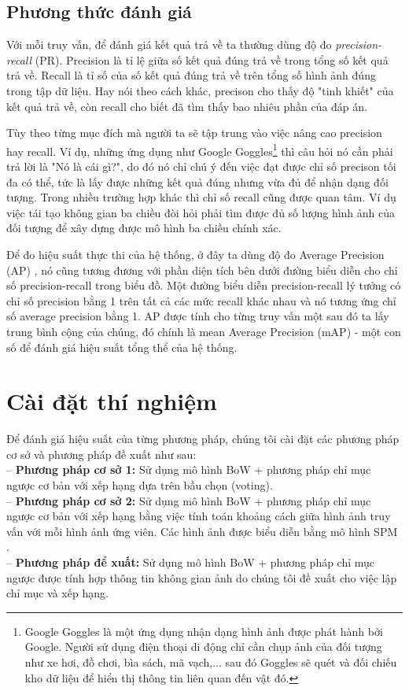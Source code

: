 \subsection{Phương thức đánh giá}
\label{evaluation}
Với mỗi truy vấn, để đánh giá kết quả trả về ta thường dùng độ đo \textit{precision-recall} (PR). Precision là tỉ lệ giữa số kết quả đúng trả về trong tổng số kết quả trả về. Recall là tỉ số của số kết quả đúng trả về trên tổng số hình ảnh đúng trong tập dữ liệu. Hay nói theo cách khác, precison cho thấy độ "tinh khiết" của kết quả trả về, còn recall cho biết đã tìm thấy bao nhiêu phần của đáp án.

Tùy theo từng mục đích mà người ta sẽ tập trung vào việc nâng cao precision hay recall. Ví dụ, những ứng dụng như Google Goggles\footnote{Google Goggles là một ứng dụng nhận dạng hình ảnh được phát hành bởi Google. Người sử dụng điện thoại di động chỉ cần chụp ảnh của đối tượng như xe hơi, đồ chơi, bìa sách, mã vạch,... sau đó Goggles sẽ quét và đối chiếu kho dữ liệu để hiển thị thông tin liên quan đến vật đó.} thì câu hỏi nó cần phải trả lời là "Nó là cái gì?", do đó nó chỉ chú ý đến việc đạt được chỉ số precison tối đa có thể, tức là lấy được những kết quả đúng nhưng vừa đủ để nhận dạng đối tượng. Trong nhiều trường hợp khác thì chỉ số recall cũng được quan tâm. Ví dụ việc tái tạo không gian ba chiều đòi hỏi phải tìm được đủ số lượng hình ảnh của đối tượng để xây dựng được mô hình ba chiều chính xác.

Để đo hiệu suất thực thi của hệ thống, ở đây ta dùng độ đo Average Precision (AP) \cite{philbin2007object}, nó cũng tương đương với phần diện tích bên dưới đường biểu diễn cho chỉ số precision-recall trong biểu đồ. Một đường biểu diễn precision-recall lý tưởng có chỉ số precision bằng 1 trên tất cả các mức recall khác nhau và nó tương ứng chỉ số average precision bằng 1. AP được tính cho từng truy vấn một sau đó ta lấy trung bình cộng của chúng, đó chính là mean Average Precision (mAP) - một con số để đánh giá hiệu suất tổng thể của hệ thống.

\section{Cài đặt thí nghiệm}
\label{experimental-setting}
Để đánh giá hiệu suất của từng phương pháp, chúng tôi cài đặt các phương pháp cơ sở và phương pháp đề xuất như sau:\\
-- \textbf{Phương pháp cơ sở 1:} Sử dụng mô hình BoW + phương pháp chỉ mục ngược cơ bản với xếp hạng dựa trên bầu chọn (voting).\\
-- \textbf{Phương pháp cơ sở 2:} Sử dụng mô hình BoW + phương pháp chỉ mục ngược cơ bản với xếp hạng bằng việc tính toán khoảng cách giữa hình ảnh truy vấn với mỗi hình ảnh ứng viên. Các hình ảnh được biểu diễn bằng mô hình SPM \cite{lazebnik2006beyond}.\\
-- \textbf{Phương pháp để xuất:} Sử dụng mô hình BoW + phương pháp chỉ mục ngược được tính hợp thông tin không gian ảnh do chúng tôi đề xuất cho việc lập chỉ mục và xếp hạng.

